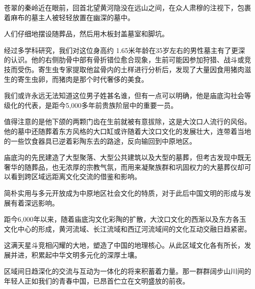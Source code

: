 苍翠的秦岭近在眼前，回首北望黄河隐没在远山之间，在众人肃穆的注视下，包裹着麻布的墓主人被轻轻放置在幽深的墓中。

人们仔细地摆设随葬品，然后用木板封盖墓室和脚坑。

经过多学科研究，我们对这位身高约 1.65米年龄在35岁左右的男性墓主有了更深的认识。他的右侧肋骨中部有骨折错位愈合现象，生前可能因参加狩猎、战斗或竞技而受伤。寄生虫专家提取他盆骨内的土样进行分析后，发现了大量因食用猪肉滋生的寄生虫卵，而猪肉是那个时代奢侈的美食。

我们或许永远无法知道这位男子姓甚名谁，但有一点可以明确，他是庙底沟社会等级化的代表，是距今5,000多年前贵族阶层中的重要一员。

值得注意的是他下颌的两颗门齿在生前就被有意拔除，这是大汶口人流行的风俗。他的墓中还随葬着东方风格的大口缸或许随着大汶口文化的发展壮大，连带着当地的一些饮食器具已逆着彩陶东去的路途，反向输回到中原地区。

庙底沟的先民建造了大型聚落、大型公共建筑以及大型的墓葬，但考古发现中既无奢华的随葬品，也无浓厚的宗教气氛，而用来凝聚族群和巩固权力的大墓葬仪却可以看到跨区域远距离文化交流的借鉴和影响。

简朴实用与多元开放成为中原地区社会文化的特质，对于此后中国文明的形成与发展有着深远影响。

距今6,000年以来，随着庙底沟文化彩陶的扩散，大汶口文化的西渐以及东方各玉文化中心的形成，黄河流域、长江流域和西辽河流域间的文化互动交融日趋紧密。

这满天星斗竞相闪耀的大地，塑造了中国的地理核心。从此区域文化各有所长，发展并进，积累起中华文明多元化的深厚土壤。

区域间日趋深化的交流与互动为一体化的将来积蓄着力量。那一群群阔步山川间的年轻人正如我们的青春中国，已昂首伫立在文明盛放的前夜。
